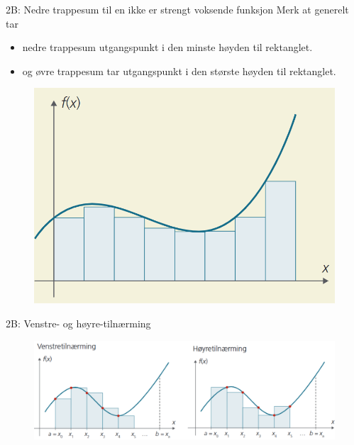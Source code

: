 \blueheader
\begin{frame}{2B: Nedre trappesum til en ikke er strengt voksende funksjon}
Merk at generelt tar 
\begin{itemize}
    \item nedre trappesum utgangspunkt i den minste høyden til rektanglet.\\
    \item og øvre trappesum tar utgangspunkt i den største høyden til rektanglet.
\end{itemize}
\begin{figure}
    \centering
    \includegraphics[width=0.6\linewidth]{R2-K2A-17.png}
\end{figure}
\end{frame}

\blueheader
\begin{frame}{2B: Venstre- og høyre-tilnærming}
\begin{figure}
    \centering
    \includegraphics[width=\linewidth]{R2-K2B-2.png}
\end{figure}
\end{frame}





